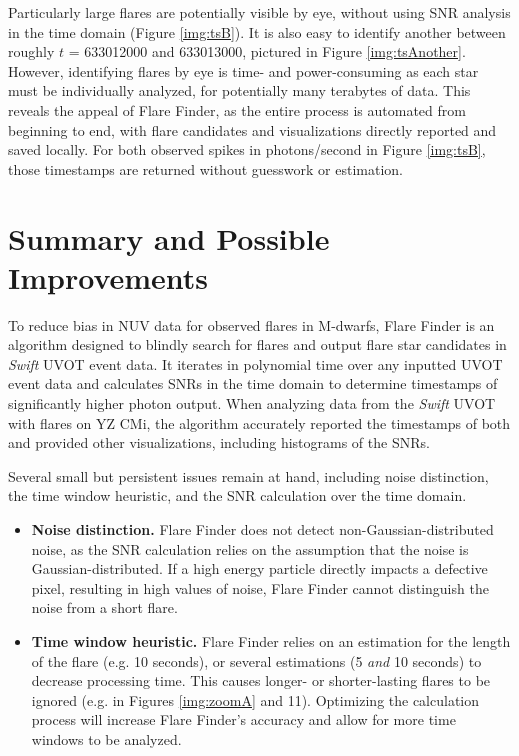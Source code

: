 \documentclass{article}
\begin{document}
\begin{multicols}{2}

Particularly large flares are potentially visible by eye, without using SNR analysis in the time domain (Figure \ref{img:tsB}). It is also easy to identify another between roughly $t$ = 633012000 and 633013000, pictured in Figure \ref{img:tsAnother}. However, identifying flares by eye is time- and power-consuming as each star must be individually analyzed, for potentially many terabytes of data. This reveals the appeal of Flare Finder, as the entire process is automated from beginning to end, with flare candidates and visualizations directly reported and saved locally. For both observed spikes in photons/second in Figure \ref{img:tsB}, those timestamps are returned without guesswork or estimation. 

\section{Summary and Possible Improvements}

To reduce bias in NUV data for observed flares in M-dwarfs, Flare Finder is an algorithm designed to blindly search for flares and output flare star candidates in \textit{Swift} UVOT event data. It iterates in polynomial time over any inputted UVOT event data and calculates SNRs in the time domain to determine timestamps of significantly higher photon output. When analyzing data from the \textit{Swift} UVOT with flares on YZ CMi, the algorithm accurately reported the timestamps of both and provided other visualizations, including histograms of the SNRs. 

Several small but persistent issues remain at hand, including noise distinction, the time window heuristic, and the SNR calculation over the time domain.
\begin{itemize}

\item \textbf{Noise distinction.} Flare Finder does not detect non-Gaussian-distributed noise, as the SNR calculation relies on the assumption that the noise is Gaussian-distributed. If a high energy particle directly impacts a defective pixel, resulting in high values of noise, Flare Finder cannot distinguish the noise from a short flare. 

\item \textbf{Time window heuristic.} Flare Finder relies on an estimation for the length of the flare (e.g. 10 seconds), or several estimations (5 \textit{and} 10 seconds) to decrease processing time. This causes longer- or shorter-lasting flares to be ignored (e.g. in Figures \ref{img:zoomA} and 11). Optimizing the calculation process will increase Flare Finder's accuracy and allow for more time windows to be analyzed.


\end{itemize}
\end{multicols}
\end{document}

